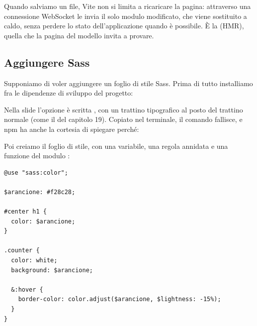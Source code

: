 Quando salviamo un file, Vite non si limita a ricaricare la pagina: attraverso
una connessione WebSocket le invia il solo modulo modificato, che viene
sostituito \guillemotleft a caldo\guillemotright, senza perdere lo stato
dell'applicazione quando è possibile. È la 
(HMR), quella che la pagina del modello invita a provare.

\subsection{Aggiungere Sass}

Supponiamo di voler aggiungere un foglio di stile Sass. Prima di tutto
installiamo  fra le dipendenze di sviluppo del progetto:


Nella slide l'opzione è scritta , con un trattino tipografico al posto
del trattino normale (come il  del capitolo 19). Copiato nel
terminale, il comando fallisce, e npm ha anche la cortesia di spiegare perché:

{\wtglifi
{}
}

Poi creiamo il foglio di stile, con una variabile, una regola annidata e una
funzione del modulo :

\begin{lstlisting}[style=css, name=src/custom.scss]
@use "sass:color";

$arancione: #f28c28;

#center h1 {
  color: $arancione;
}

.counter {
  color: white;
  background: $arancione;

  &:hover {
    border-color: color.adjust($arancione, $lightness: -15%);
  }
}
\end{lstlisting}

